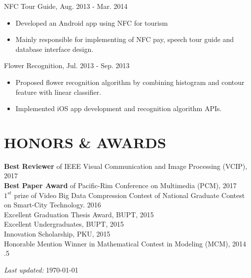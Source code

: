 \documentclass[margin, 10pt]{res} %
\begin{document}
\begin{resume}
NFC Tour Guide, \hfill{Aug. 2013 - Mar. 2014}
\begin{itemize} \itemsep -2pt
    \item{Developed an Android app using NFC for tourism}
    \item{Mainly responsible for implementing of NFC pay, speech tour guide and database interface design.}
\end{itemize}
Flower Recognition, \hfill{Jul. 2013 - Sep. 2013}
\begin{itemize} \itemsep -2pt
    \item{Proposed flower recognition algorithm by combining histogram and contour feature with linear classifier.}
    \item{Implemented iOS app development and recognition algorithm APIs.}
\end{itemize}



\section{HONORS \& AWARDS}

{\bf Best Reviewer} of IEEE Visual Communication and Image Processing (VCIP), \hfill 2017 \\
{\bf Best Paper Award} of Pacific-Rim Conference on Multimedia (PCM), \hfill 2017 \\
{\bf ${1}^{st}$} prize of Video Big Data Compression Contest of National Graduate Contest on Smart-City Technology. \hfill 2016 \\
Excellent Graduation Thesis Award, BUPT, \hfill 2015 \\
Excellent Undergraduates, BUPT, \hfill 2015 \\
Innovation Scholarship, PKU, \hfill 2015 \\
Honorable Mention Winner in Mathematical Contest in Modeling (MCM), \hfill 2014 \\


\moveleft.5\hoffset\centerline{
\textit{Last updated:}
\today
}

\end{resume}
\end{document}
